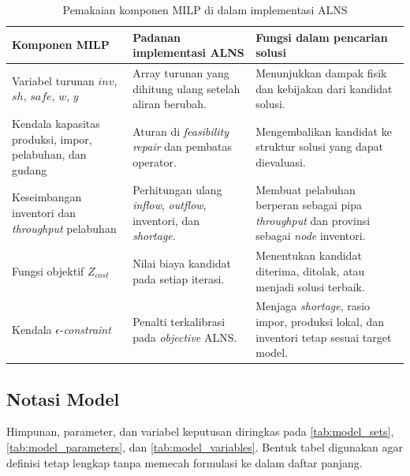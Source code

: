 \documentclass{file/TA-ITS}
\theoremstyle{definition}
\theoremstyle{definition}
\theoremstyle{plain}
\begin{document}
\begin{table}[H]
\centering
\caption{Pemakaian komponen MILP di dalam implementasi ALNS}
\label{tab:milp_alns_bridge}
\footnotesize
\renewcommand{\arraystretch}{1.08}
\begin{tabularx}{\textwidth}{@{}p{}p{}X@{}}
\toprule
\textbf{Komponen MILP} & \textbf{Padanan implementasi ALNS} & \textbf{Fungsi dalam pencarian solusi} \\
\midrule
Variabel turunan $inv$, $sh$, $safe$, $w$, $y$ & Array turunan yang dihitung ulang setelah aliran berubah. & Menunjukkan dampak fisik dan kebijakan dari kandidat solusi. \\
Kendala kapasitas produksi, impor, pelabuhan, dan gudang & Aturan di \textit{feasibility repair} dan pembatas operator. & Mengembalikan kandidat ke struktur solusi yang dapat dievaluasi. \\
Keseimbangan inventori dan \textit{throughput} pelabuhan & Perhitungan ulang \textit{inflow}, \textit{outflow}, inventori, dan \textit{shortage}. & Membuat pelabuhan berperan sebagai pipa \textit{throughput} dan provinsi sebagai \textit{node} inventori. \\
Fungsi objektif $Z_{cost}$ & Nilai biaya kandidat pada setiap iterasi. & Menentukan kandidat diterima, ditolak, atau menjadi solusi terbaik. \\
Kendala $\epsilon$-\textit{constraint} & Penalti terkalibrasi pada \textit{objective} ALNS. & Menjaga \textit{shortage}, rasio impor, produksi lokal, dan inventori tetap sesuai target model. \\
\bottomrule
\end{tabularx}
\renewcommand{\arraystretch}{1}
\end{table}

\subsection{Notasi Model}

Himpunan, parameter, dan variabel keputusan diringkas pada \ref{tab:model_sets}, \ref{tab:model_parameters}, dan \ref{tab:model_variables}. Bentuk tabel digunakan agar definisi tetap lengkap tanpa memecah formulasi ke dalam daftar panjang.
\end{document}
